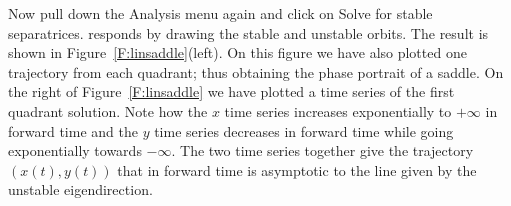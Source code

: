 \documentclass{ximera}
\begin{document}
Now pull down the {\sf Analysis} menu again and click on
{\sf Solve for stable separatrices}.  {\sf \pplane} responds by 
drawing the stable and unstable orbits.
The result is shown in Figure~\ref{F:linsaddle}(left).
On this figure we have also plotted one trajectory
from each quadrant; thus obtaining the phase portrait of a saddle.
On the right of Figure~\ref{F:linsaddle} we have plotted a
time series of the first quadrant solution.  Note how the $x$
time series increases exponentially to $+\infty$ in forward time and 
the $y$ time series decreases in forward time while going exponentially 
towards $-\infty$.  The two time series together
give the trajectory $(x(t),y(t))$ that in forward time is asymptotic
to the line given by the unstable eigendirection.





\end{document}
